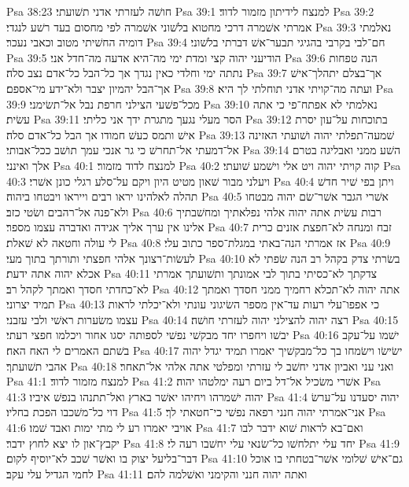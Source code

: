 Psa 38:23  חושׁה לעזרתי אדני תשׁועתי׃
Psa 39:1  למנצח לידיתון מזמור לדוד׃
Psa 39:2  אמרתי אשׁמרה דרכי מחטוא בלשׁוני אשׁמרה לפי מחסום בעד רשׁע לנגדי׃
Psa 39:3  נאלמתי דומיה החשׁיתי מטוב וכאבי נעכר׃
Psa 39:4  חם־לבי בקרבי בהגיגי תבער־אשׁ דברתי בלשׁוני׃
Psa 39:5  הודיעני יהוה קצי ומדת ימי מה־היא אדעה מה־חדל אני׃
Psa 39:6  הנה טפחות נתתה ימי וחלדי כאין נגדך אך כל־הבל כל־אדם נצב סלה׃
Psa 39:7  אך־בצלם יתהלך־אישׁ אך־הבל יהמיון יצבר ולא־ידע מי־אספם׃
Psa 39:8  ועתה מה־קויתי אדני תוחלתי לך היא׃
Psa 39:9  מכל־פשׁעי הצילני חרפת נבל אל־תשׂימני׃
Psa 39:10  נאלמתי לא אפתח־פי כי אתה עשׂית׃
Psa 39:11  הסר מעלי נגעך מתגרת ידך אני כליתי׃
Psa 39:12  בתוכחות על־עון יסרת אישׁ ותמס כעשׁ חמודו אך הבל כל־אדם סלה׃
Psa 39:13  שׁמעה־תפלתי יהוה ושׁועתי האזינה אל־דמעתי אל־תחרשׁ כי גר אנכי עמך תושׁב ככל־אבותי׃
Psa 39:14  השׁע ממני ואבליגה בטרם אלך ואינני׃
Psa 40:1  למנצח לדוד מזמור׃
Psa 40:2  קוה קויתי יהוה ויט אלי וישׁמע שׁועתי׃
Psa 40:3  ויעלני מבור שׁאון מטיט היון ויקם על־סלע רגלי כונן אשׁרי׃
Psa 40:4  ויתן בפי שׁיר חדשׁ תהלה לאלהינו יראו רבים וייראו ויבטחו ביהוה׃
Psa 40:5  אשׁרי הגבר אשׁר־שׂם יהוה מבטחו ולא־פנה אל־רהבים ושׂטי כזב׃
Psa 40:6  רבות עשׂית אתה יהוה אלהי נפלאתיך ומחשׁבתיך אלינו אין ערך אליך אגידה ואדברה עצמו מספר׃
Psa 40:7  זבח ומנחה לא־חפצת אזנים כרית לי עולה וחטאה לא שׁאלת׃
Psa 40:8  אז אמרתי הנה־באתי במגלת־ספר כתוב עלי׃
Psa 40:9  לעשׂות־רצונך אלהי חפצתי ותורתך בתוך מעי׃
Psa 40:10  בשׂרתי צדק בקהל רב הנה שׂפתי לא אכלא יהוה אתה ידעת׃
Psa 40:11  צדקתך לא־כסיתי בתוך לבי אמונתך ותשׁועתך אמרתי לא־כחדתי חסדך ואמתך לקהל רב׃
Psa 40:12  אתה יהוה לא־תכלא רחמיך ממני חסדך ואמתך תמיד יצרוני׃
Psa 40:13  כי אפפו־עלי רעות עד־אין מספר השׂיגוני עונתי ולא־יכלתי לראות עצמו משׂערות ראשׁי ולבי עזבני׃
Psa 40:14  רצה יהוה להצילני יהוה לעזרתי חושׁה׃
Psa 40:15  יבשׁו ויחפרו יחד מבקשׁי נפשׁי לספותה יסגו אחור ויכלמו חפצי רעתי׃
Psa 40:16  ישׁמו על־עקב בשׁתם האמרים לי האח האח׃
Psa 40:17  ישׂישׂו וישׂמחו בך כל־מבקשׁיך יאמרו תמיד יגדל יהוה אהבי תשׁועתך׃
Psa 40:18  ואני עני ואביון אדני יחשׁב לי עזרתי ומפלטי אתה אלהי אל־תאחר׃
Psa 41:1  למנצח מזמור לדוד׃
Psa 41:2  אשׁרי משׂכיל אל־דל ביום רעה ימלטהו יהוה׃
Psa 41:3  יהוה ישׁמרהו ויחיהו יאשׁר בארץ ואל־תתנהו בנפשׁ איביו׃
Psa 41:4  יהוה יסעדנו על־ערשׂ דוי כל־משׁכבו הפכת בחליו׃
Psa 41:5  אני־אמרתי יהוה חנני רפאה נפשׁי כי־חטאתי לך׃
Psa 41:6  אויבי יאמרו רע לי מתי ימות ואבד שׁמו׃
Psa 41:7  ואם־בא לראות שׁוא ידבר לבו יקבץ־און לו יצא לחוץ ידבר׃
Psa 41:8  יחד עלי יתלחשׁו כל־שׂנאי עלי יחשׁבו רעה לי׃
Psa 41:9  דבר־בליעל יצוק בו ואשׁר שׁכב לא־יוסיף לקום׃
Psa 41:10  גם־אישׁ שׁלומי אשׁר־בטחתי בו אוכל לחמי הגדיל עלי עקב׃
Psa 41:11  ואתה יהוה חנני והקימני ואשׁלמה להם׃
